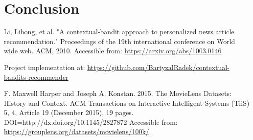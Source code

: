 \documentclass[12pt, titlepage]{article}
\begin{document}
\section{Conclusion}\label{sec:conclusion}


\begin{thebibliography}{0}

   Li, Lihong, et al. "A contextual-bandit approach to personalized news article recommendation." Proceedings of the 19th international conference on World wide web. ACM, 2010. Accessible from: \url{https://arxiv.org/abs/1003.0146}
  
   Project implementation at: \url{https://github.com/BartyzalRadek/contextual-bandits-recommender}
  
   F. Maxwell Harper and Joseph A. Konstan. 2015. The MovieLens Datasets:
History and Context. ACM Transactions on Interactive Intelligent
Systems (TiiS) 5, 4, Article 19 (December 2015), 19 pages.
DOI=http://dx.doi.org/10.1145/2827872 Accessible from: \url{https://grouplens.org/datasets/movielens/100k/}



\end{thebibliography}
\end{document}
